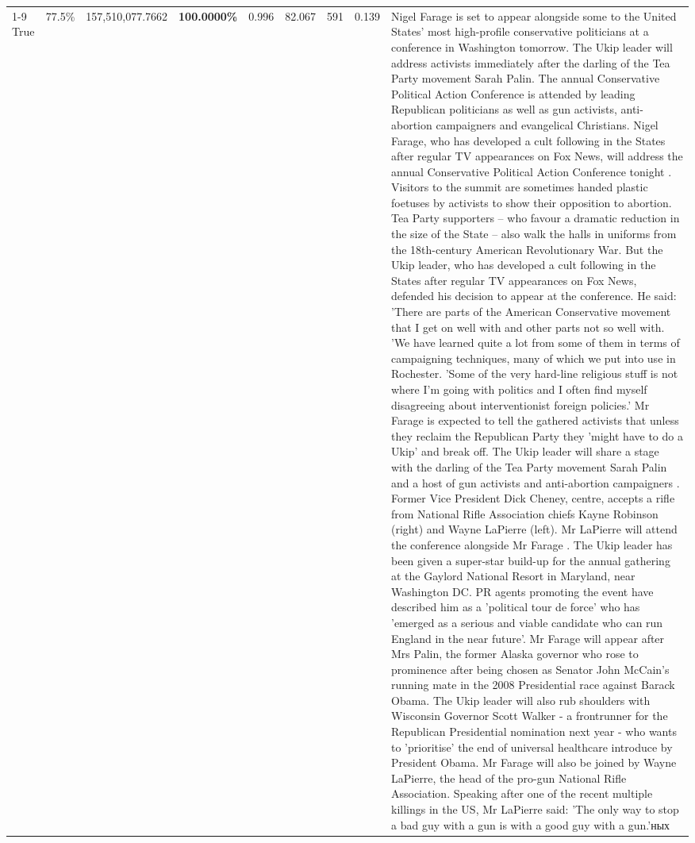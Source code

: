 \begin{table}[H]
\begin{tabular}{lllrlllll}
\cline{1-9} \cline{2-9}
True & 77.5\% & 157,510,077.7662 & \bfseries \color{red} 100.0000\% & 0.996 & 82.067 & 591 & 0.139 & Nigel Farage is set to appear alongside some to the United States' most high-profile conservative politicians at a conference in Washington tomorrow. The Ukip leader will address activists immediately after the darling of the Tea Party movement Sarah Palin. The annual Conservative Political Action Conference is attended by leading Republican politicians as well as gun activists, anti-abortion campaigners and evangelical Christians. Nigel Farage, who has developed a cult following in the States after regular TV appearances on Fox News, will address the annual Conservative Political Action Conference tonight . Visitors to the summit are sometimes handed plastic foetuses by activists to show their opposition to abortion. Tea Party supporters – who favour a dramatic reduction in the size of the State – also walk the halls in uniforms from the 18th-century American Revolutionary War. But the Ukip leader, who has developed a cult following in the States after regular TV appearances on Fox News, defended his decision to appear at the conference. He said: 'There are parts of the American Conservative movement that I get on well with and other parts not so well with. 'We have learned quite a lot from some of them in terms of campaigning techniques, many of which we put into use in Rochester. 'Some of the very hard-line religious stuff is not where I'm going with politics and I often find myself disagreeing about interventionist foreign policies.' Mr Farage is expected to tell the gathered activists that unless they reclaim the Republican Party they 'might have to do a Ukip' and break off. The Ukip leader will share a stage with the darling of the Tea Party movement Sarah Palin and a host of gun activists and anti-abortion campaigners . Former Vice President Dick Cheney, centre, accepts a rifle from National Rifle Association chiefs Kayne Robinson (right) and Wayne LaPierre (left). Mr LaPierre will attend the conference alongside Mr Farage . The Ukip leader has been given a super-star build-up for the annual gathering at the Gaylord National Resort in Maryland, near Washington DC. PR agents promoting the event have described him as a 'political tour de force' who has 'emerged as a serious and viable candidate who can run England in the near future'. Mr Farage will appear after Mrs Palin, the former Alaska governor who rose to prominence after being chosen as Senator John McCain's running mate in the 2008 Presidential race against Barack Obama. The Ukip leader will also rub shoulders with Wisconsin Governor Scott Walker - a frontrunner for the Republican Presidential nomination next year - who wants to 'prioritise' the end of universal healthcare introduce by President Obama. Mr Farage will also be joined by Wayne LaPierre, the head of the pro-gun National Rifle Association. Speaking after one of the recent multiple killings in the US, Mr LaPierre said: 'The only way to stop a bad guy with a gun is with a good guy with a gun.'ных \\

\end{tabular}
\end{table}
